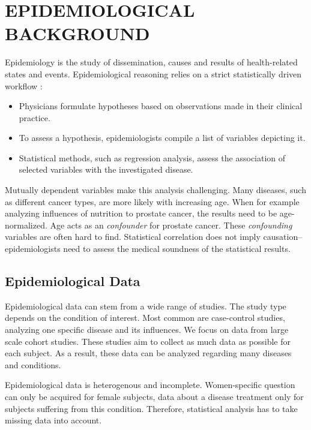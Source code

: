 \documentclass[a4paper,twoside]{style/article}
\newcommand{\com}[1]{\textcolor{orange}{\uline{#1}}}
\begin{document}
\section{\uppercase{Epidemiological Background}}
\label{sec:EpidemiologicalBackground}
\noindent Epidemiology is the study of dissemination, causes and results of health-related states and events.
Epidemiological reasoning relies on a strict statistically driven workflow \cite{Fletcher}:
\begin{itemize}
	\item Physicians formulate hypotheses based on observations made in their clinical practice.
	\item To assess a hypothesis, epidemiologists compile a list of variables depicting it.
	\item Statistical methods, such as regression analysis, assess the association of selected variables with the investigated disease.
\end{itemize}
Mutually dependent variables make this analysis challenging.
Many diseases, such as different cancer types, are more likely with increasing age.
When for example analyzing influences of nutrition to prostate cancer, the results need to be age-normalized.
Age acts as an \emph{confounder} for prostate cancer.
These \emph{confounding} variables are often hard to find.
Statistical correlation does not imply causation--epidemiologists need to assess the medical soundness of the statistical results.
\subsection{Epidemiological Data}
Epidemiological data can stem from a wide range of studies.
The study type depends on the condition of interest.
Most common are case-control studies, analyzing one specific disease and its influences.
We focus on data from large scale cohort studies.
These studies aim to collect as much data as possible for each subject.
As a result, these data can be analyzed regarding many diseases and conditions.

Epidemiological data is heterogenous and incomplete.
Women-specific question can only be acquired for female subjects, data about a disease treatment only for subjects suffering from this condition.
Therefore, statistical analysis has to take missing data into account.
\end{document}
